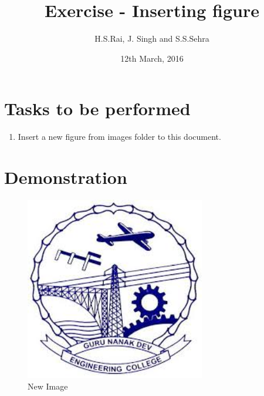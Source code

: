 \documentclass{article}
\title{Exercise - Inserting figure}
\author{H.S.Rai, J. Singh and S.S.Sehra}
\date{12th March, 2016}
\begin{document}
\maketitle	
\section*{Tasks to be performed}
\begin{enumerate}	
\item Insert a new figure from images folder to this document.
\end{enumerate}
\section*{Demonstration}
\begin{figure}
\centering
\includegraphics[width=0.7\textwidth]{../../images/gnelogo}
\caption{New Image}
\label{fig:gnelogo}
\end{figure}
\end{document}
